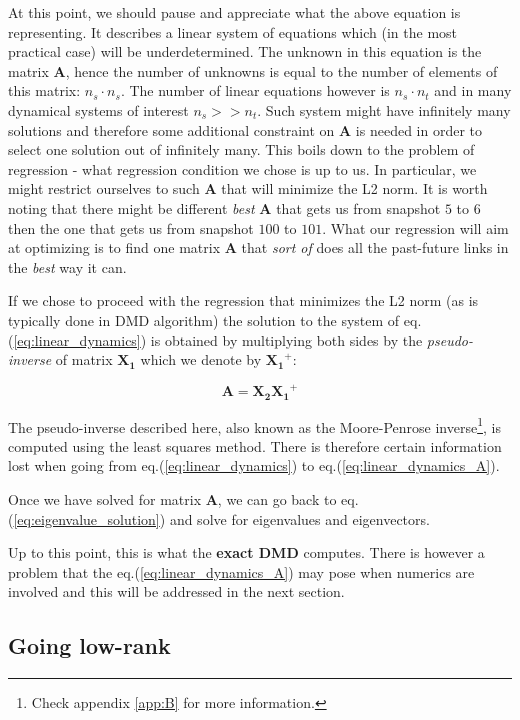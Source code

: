 \documentclass[10pt,twocolumn]{article}
\begin{document}
At this point, we should pause and appreciate what the above equation is representing. It describes a linear system of equations which (in the most practical case) will be underdetermined. The unknown in this equation is the matrix $\mathbf{A}$, hence the number of unknowns is equal to the number of elements of this matrix: $n_s \cdot n_s$. The number of linear equations however is $n_s \cdot n_t$ and in many dynamical systems of interest $n_s >> n_t$. Such system might have infinitely many solutions and therefore some additional constraint on $\mathbf{A}$ is needed in order to select one solution out of infinitely many. This boils down to the problem of regression - what regression condition we chose is up to us. In particular, we might restrict ourselves to such $\mathbf{A}$ that will minimize the L2 norm. It is worth noting that there might be different \textit{best} $\mathbf{A}$ that gets us from snapshot $5$ to $6$ then the one that gets us from snapshot $100$ to $101$. What our regression will aim at optimizing is to find one matrix $\mathbf{A}$ that \textit{sort of} does all the past-future links in the \textit{best} way it can.

If we chose to proceed with the regression that minimizes the L2 norm (as is typically done in DMD algorithm) the solution to the system of eq.(\ref{eq:linear_dynamics}) is obtained by multiplying both sides by the \textit{pseudo-inverse} of matrix $\mathbf{X_1}$ which we denote by $\mathbf{X_1}^{+}$:

\begin{equation} \label{eq:linear_dynamics_A}
\mathbf{A} = \mathbf{X_2} \mathbf{X_1}^{+}
\end{equation}

The pseudo-inverse described here, also known as the Moore-Penrose inverse\footnote{Check appendix \ref{app:B} for more information.}, is computed using the least squares method. There is therefore certain information lost when going from eq.(\ref{eq:linear_dynamics}) to eq.(\ref{eq:linear_dynamics_A}).

Once we have solved for matrix $\mathbf{A}$, we can go back to eq.(\ref{eq:eigenvalue_solution}) and solve for eigenvalues and eigenvectors.

Up to this point, this is what the \textbf{exact DMD} computes. There is however a problem that the eq.(\ref{eq:linear_dynamics_A}) may pose when numerics are involved and this will be addressed in the next section. 

\subsection{Going low-rank}
\end{document}
